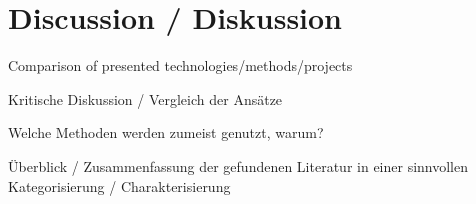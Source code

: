 \chapter{Discussion / Diskussion}
\label{ch:discussion}

Comparison of presented technologies/methods/projects

Kritische Diskussion / Vergleich der Ansätze

Welche Methoden werden zumeist genutzt, warum?

Überblick / Zusammenfassung der gefundenen Literatur in einer sinnvollen Kategorisierung / Charakterisierung
